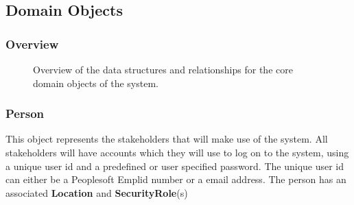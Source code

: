 \documentclass[12pt]{article}
\begin{document}
\vspace{0.2in}
\newpage
\subsection{Domain Objects}
\subsubsection{Overview}

\begin{figure}[H]
\centering	
{}
\caption{Overview of the data structures and relationships for the core domain objects of the
system.}
\end{figure}

\newpage
\subsubsection{Person}
This object represents the stakeholders that will make use of the system. All stakeholders will have accounts which they will use to log on to the system, using a unique user id and a predefined or user specified password. The unique user id can either be a Peoplesoft Emplid number or a email address. The person has an associated \textbf{Location} and \textbf{SecurityRole}(s)
\end{document}
